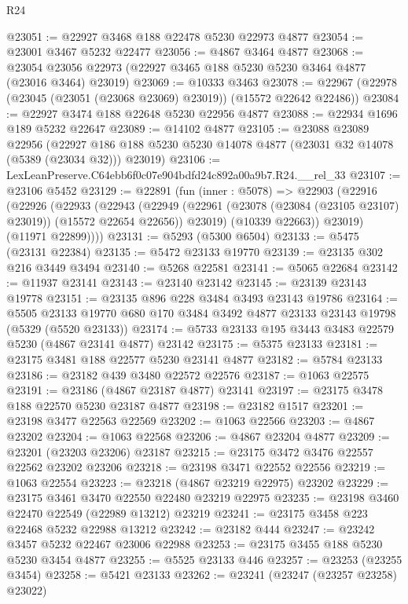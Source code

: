\begin{lexlean}{R24}
\begin{coremodule}
@23051 := @22927 @3468 @188 @22478 @5230 @22973 @4877
@23054 := @23001 @3467 @5232 @22477
@23056 := @4867 @3464 @4877
@23068 := @23054 @23056 @22973 (@22927 @3465 @188 @5230 @5230 @3464 @4877 (@23016 @3464) @23019)
@23069 := @10333 @3463
@23078 := @22967 (@22978 (@23045 (@23051 (@23068 @23069) @23019)) (@15572 @22642 @22486))
@23084 := @22927 @3474 @188 @22648 @5230 @22956 @4877
@23088 := @22934 @1696 @189 @5232 @22647
@23089 := @14102 @4877
@23105 := @23088
    @23089
    @22956
    (@22927 @186 @188 @5230 @5230 @14078 @4877 (@23031 @32 @14078 (@5389 (@23034 @32))) @23019)
@23106 := LexLeanPreserve.C64ebb6f0c07e904bdfd24c892a00a9b7.R24.__rel_33
@23107 := @23106 @5452
@23129 := @22891
    (fun (inner : @5078) =>
    @22903
      (@22916
        (@22926
          (@22933
            (@22943
              (@22949
                (@22961 (@23078 (@23084 (@23105 @23107) @23019)) (@15572 @22654 @22656))
                @23019)
              (@10339 @22663))
            @23019)
          (@11971 @22899))))
@23131 := @5293 (@5300 @6504)
@23133 := @5475 (@23131 @22384)
@23135 := @5472 @23133 @19770
@23139 := @23135 @302 @216 @3449 @3494
@23140 := @5268 @22581
@23141 := @5065 @22684
@23142 := @11937 @23141
@23143 := @23140 @23142
@23145 := @23139 @23143 @19778
@23151 := @23135 @896 @228 @3484 @3493 @23143 @19786
@23164 := @5505
    @23133
    @19770
    @680
    @170
    @3484
    @3492
    @4877
    @23133
    @23143
    @19798
    (@5329 (@5520 @23133))
@23174 := @5733 @23133 @195 @3443 @3483 @22579 @5230 (@4867 @23141 @4877) @23142
@23175 := @5375 @23133
@23181 := @23175 @3481 @188 @22577 @5230 @23141 @4877
@23182 := @5784 @23133
@23186 := @23182 @439 @3480 @22572 @22576
@23187 := @1063 @22575
@23191 := @23186 (@4867 @23187 @4877) @23141
@23197 := @23175 @3478 @188 @22570 @5230 @23187 @4877
@23198 := @23182 @1517
@23201 := @23198 @3477 @22563 @22569
@23202 := @1063 @22566
@23203 := @4867 @23202
@23204 := @1063 @22568
@23206 := @4867 @23204 @4877
@23209 := @23201 (@23203 @23206) @23187
@23215 := @23175 @3472 @3476 @22557 @22562 @23202 @23206
@23218 := @23198 @3471 @22552 @22556
@23219 := @1063 @22554
@23223 := @23218 (@4867 @23219 @22975) @23202
@23229 := @23175 @3461 @3470 @22550 @22480 @23219 @22975
@23235 := @23198 @3460 @22470 @22549 (@22989 @13212) @23219
@23241 := @23175 @3458 @223 @22468 @5232 @22988 @13212
@23242 := @23182 @444
@23247 := @23242 @3457 @5232 @22467 @23006 @22988
@23253 := @23175 @3455 @188 @5230 @5230 @3454 @4877
@23255 := @5525 @23133 @446
@23257 := @23253 (@23255 @3454)
@23258 := @5421 @23133
@23262 := @23241 (@23247 (@23257 @23258) @23022)

\end{coremodule}
\end{lexlean}

